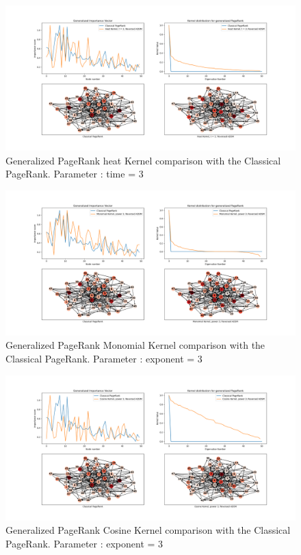 \documentclass[sn-mathphys]{sn-jnl}%
\theoremstyle{thmstyleone}%
\theoremstyle{thmstyletwo}%
\theoremstyle{thmstylethree}%
\begin{document}
\begin{appendices}
\begin{figure}[H]
    \centering
    \centerline{
    \includegraphics[width= 1.25\textwidth]{results_figures/heat_kernel_3.png}
    }
    \caption{Generalized PageRank heat Kernel comparison with the Classical PageRank. Parameter : time = 3}
    \label{fig:heatK3}
\end{figure}


\begin{figure}[H]
    \centering
    \centerline{
    \includegraphics[width= 1.25\textwidth]{results_figures/monomial_kernel_3.png}
    }
    \caption{Generalized PageRank Monomial Kernel comparison with the Classical PageRank. Parameter : exponent = 3}
    \label{fig:monomialK3}
\end{figure}

\begin{figure}[H]
    \centering
    \centerline{
    \includegraphics[width= 1.25\textwidth]{results_figures/cosine_kernel_3.png}
    }
    \caption{Generalized PageRank Cosine Kernel comparison with the Classical PageRank. Parameter : exponent = 3}
    \label{fig:cosineK3}
\end{figure}


\end{appendices}
\end{document}

